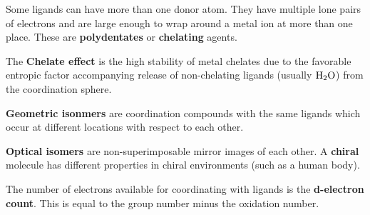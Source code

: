 \documentclass{article}
\begin{document}
Some ligands can have more than one donor atom. They have multiple lone pairs of
electrons and are large enough to wrap around a metal ion at more than one
place. These are \textbf{polydentates} or \textbf{chelating} agents. 

The \textbf{Chelate effect} is the high stability of metal chelates due to the
favorable entropic factor accompanying release of non-chelating ligands (usually
$\ce{H_2O}$) from the coordination sphere. 

\textbf{Geometric isonmers} are coordination compounds with the same ligands
which occur at different locations with respect to each other.

\textbf{Optical isomers} are non-superimposable mirror images of each other. A
\textbf{chiral} molecule has different properties in chiral environments (such
as a human body).

The number of electrons available for coordinating with ligands is the
\textbf{d-electron count}. This is equal to the group number minus the oxidation
number.
\end{document}
